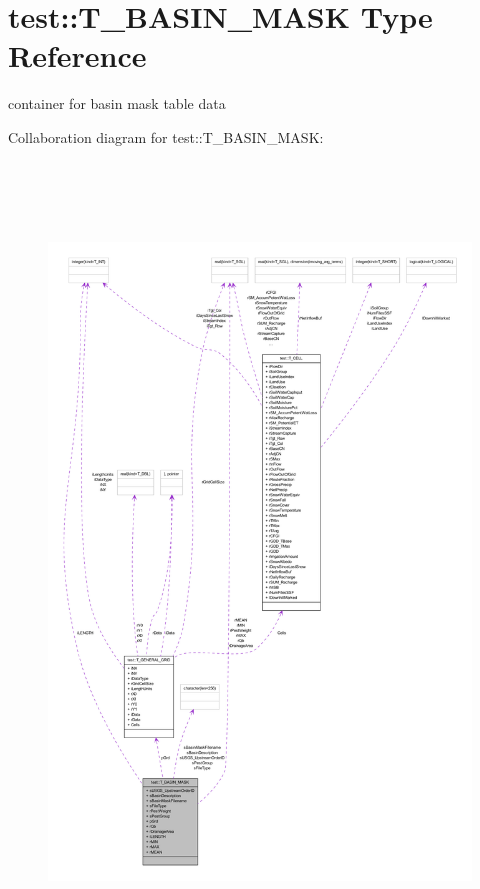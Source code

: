 \hypertarget{typetest_1_1_t___b_a_s_i_n___m_a_s_k}{
\section{test::T\_\-BASIN\_\-MASK Type Reference}
\label{typetest_1_1_t___b_a_s_i_n___m_a_s_k}
}


container for basin mask table data  




Collaboration diagram for test::T\_\-BASIN\_\-MASK:\nopagebreak
\begin{figure}[H]
\begin{center}
\leavevmode
\includegraphics[height=600pt]{typetest_1_1_t___b_a_s_i_n___m_a_s_k__coll__graph}
\end{center}
\end{figure}

